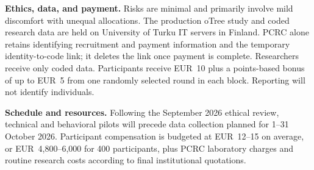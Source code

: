 \textbf{Ethics, data, and payment.} Risks are minimal and primarily involve mild discomfort with unequal allocations. The production oTree study and coded research data are held on University of Turku IT servers in Finland. PCRC alone retains identifying recruitment and payment information and the temporary identity-to-code link; it deletes the link once payment is complete. Researchers receive only coded data. Participants receive EUR~10 plus a points-based bonus of up to EUR~5 from one randomly selected round in each block. Reporting will not identify individuals.

\textbf{Schedule and resources.} Following the September 2026 ethical review, technical and behavioral pilots will precede data collection planned for 1--31 October 2026. Participant compensation is budgeted at EUR~12--15 on average, or EUR~4,800--6,000 for 400 participants, plus PCRC laboratory charges and routine research costs according to final institutional quotations.


